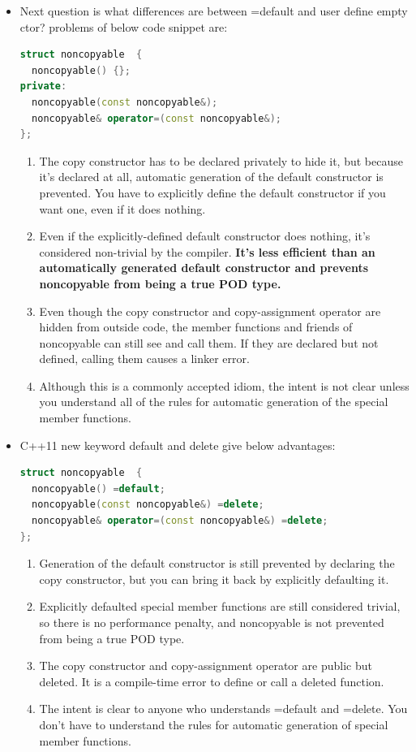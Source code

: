 \documentclass[a4paper,12pt,twoside]{book}
\begin{document}
\begin{itemize}
\item Next question is what differences are between =default and user define empty ctor? problems of below code snippet are:
\begin{lstlisting}[frame=single, language=c++]
struct noncopyable  {
  noncopyable() {};
private:
  noncopyable(const noncopyable&);
  noncopyable& operator=(const noncopyable&);
};
\end{lstlisting}
\begin{enumerate}
\item The copy constructor has to be declared privately to hide it, but because it's declared at all, automatic generation of the default constructor is prevented. You have to explicitly define the default constructor if you want one, even if it does nothing.
\item Even if the explicitly-defined default constructor does nothing, it's considered non-trivial by the compiler. \textbf{It's less efficient than an automatically generated default constructor and prevents noncopyable from being a true POD type.}
\item Even though the copy constructor and copy-assignment operator are hidden from outside code, the member functions and friends of noncopyable can still see and call them. If they are declared but not defined, calling them causes a linker error.
\item Although this is a commonly accepted idiom, the intent is not clear unless you understand all of the rules for automatic generation of the special member functions.
\end{enumerate}


\item C++11 new keyword default and delete give below advantages:
\begin{lstlisting}[frame=single, language=c++]
struct noncopyable  {
  noncopyable() =default;
  noncopyable(const noncopyable&) =delete;
  noncopyable& operator=(const noncopyable&) =delete;
};
\end{lstlisting}
\begin{enumerate}
\item Generation of the default constructor is still prevented by declaring the copy constructor, but you can bring it back by explicitly defaulting it.
\item Explicitly defaulted special member functions are still considered trivial, so there is no performance penalty, and noncopyable is not prevented from being a true POD type.
\item The copy constructor and copy-assignment operator are public but deleted. It is a compile-time error to define or call a deleted function.
\item The intent is clear to anyone who understands =default and =delete. You don't have to understand the rules for automatic generation of special member functions.
\end{enumerate}



\end{itemize}
\end{document}
